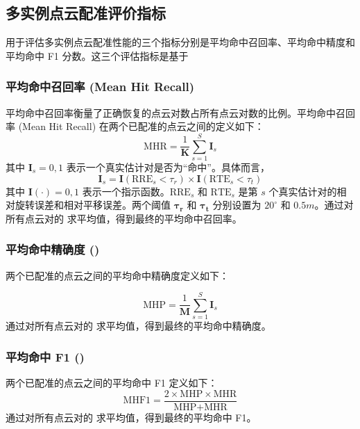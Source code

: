 \subsection{多实例点云配准评价指标}
用于评估多实例点云配准性能的三个指标分别是平均命中召回率、平均命中精度和平均命中 F1 分数。这三个评估指标是基于

\subsubsection{平均命中召回率 (Mean Hit Recall)}
平均命中召回率衡量了正确恢复的点云对数占所有点云对数的比例。平均命中召回率 (Mean Hit Recall) 在两个已配准的点云之间的定义如下：
\begin{equation}
    \text{MHR} = \frac{1}{\boldsymbol{K}} \sum_{s=1}^{S} \boldsymbol{I}_s
\end{equation}
其中 $\boldsymbol{I}_s = {0, 1}$ 表示一个真实估计对是否为“命中”。具体而言，
\begin{equation}
    \boldsymbol{I}_s = \boldsymbol{I}(\text{RRE}_s < \tau_r) \times \boldsymbol{I}(\text{RTE}_s < \tau_t)
\end{equation}
其中 $\boldsymbol{I}(\cdot) = {0, 1}$ 表示一个指示函数。$\text{RRE}_s$ 和 $\text{RTE}_s$ 是第 $s$ 个真实估计对的相对旋转误差和相对平移误差。两个阈值 $\boldsymbol{\tau_r}$ 和 $\boldsymbol{\tau_t}$ 分别设置为 $20^\circ$ 和 $0.5m$。通过对所有点云对的  求平均值，得到最终的平均命中召回率。

\subsubsection{平均命中精确度 ()}
两个已配准的点云之间的平均命中精确度定义如下：

\begin{equation}
\text{MHP} = \frac{1}{\boldsymbol{M}} \sum_{s=1}^{S} \boldsymbol{I}_s
\end{equation}
通过对所有点云对的  求平均值，得到最终的平均命中精确度。

\subsubsection{平均命中 F1 ()}
两个已配准的点云之间的平均命中 F1 定义如下：
\begin{equation}
\text{MHF1} = \frac{2 \times \text{MHP} \times \text{MHR}}{\text{MHP} + \text{MHR}}
\end{equation}
通过对所有点云对的  求平均值，得到最终的平均命中 F1。


